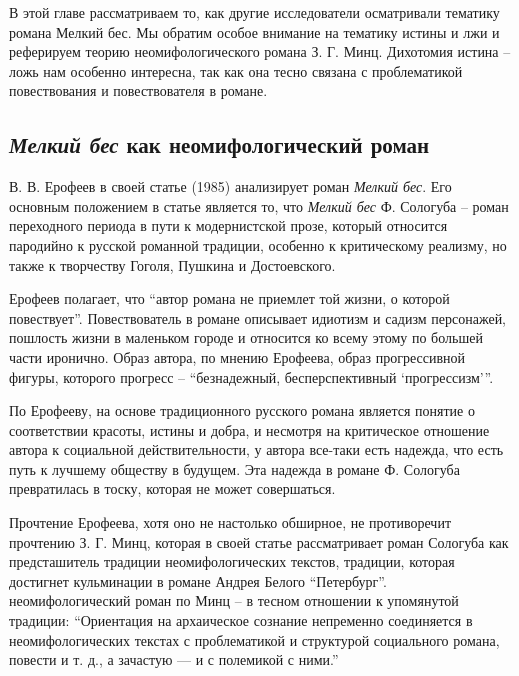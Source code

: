 \documentclass[12pt,a4paper]{article}
\begin{document}
В этой главе рассматриваем то, как другие исследователи осматривали тематику романа Мелкий бес. Мы обратим особое внимание на тематику истины и лжи и реферируем теорию неомифологического романа З. Г. Минц. Дихотомия истина – ложь нам особенно интересна, так как она тесно связана с проблематикой повествования и повествователя в романе.


\subsection{\emph{Мелкий бес} как неомифологический роман}

В. В. Ерофеев в своей статье  (1985) анализирует роман \emph{Мелкий бес}. Его основным положением в статье является то, что \emph{Мелкий бес} Ф. Сологуба -- роман переходного периода в пути к модернистской прозе, который относится пародийно к русской романной традиции, особенно к критическому реализму, но также к творчеству Гоголя, Пушкина и Достоевского. \parencite[145.]{jerofeev1985}


Ерофеев полагает, что \enquote{автор романа не приемлет той жизни, о которой повествует}. Повествователь в романе описывает идиотизм и садизм персонажей, пошлость жизни в маленьком городе и относится ко всему этому по большей части иронично. Образ автора, по мнению Ерофеева, образ прогрессивной фигуры, которого прогресс -- \enquote{безнадежный, бесперспективный \enquote{прогрессизм}}. \Parencite[146.]{jerofeev1985}


По Ерофееву, на основе традиционного русского романа является понятие о соответствии красоты, истины и добра, и несмотря на критическое отношение автора к социальной действительности, у автора все-таки есть надежда, что есть путь к лучшему обществу в будущем. Эта надежда в романе Ф. Сологуба превратилась в тоску, которая не может совершаться.  \parencite[158.]{jerofeev1985}



Прочтение Ерофеева, хотя оно не настолько обширное, не противоречит прочтению З. Г. Минц, которая в  своей статье  \parencite*{mints2004} рассматривает роман Сологуба как предсташитель традиции неомифологических текстов, традиции, которая достигнет кульминации в романе Андрея Белого \enquote{Петербург}. неомифологический роман по Минц -- в тесном отношении к упомянутой традиции: \enquote{Ориентация на архаическое сознание непременно соединяется в неомифологических текстах с проблематикой и структурой социального романа, повести и т. д., а зачастую — и с полемикой с ними.} \Parencite[60.]{mints2004}
\end{document}
